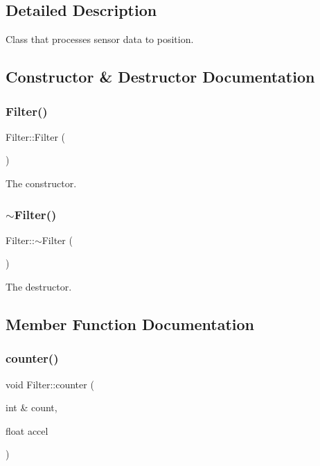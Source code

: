 \subsection{Detailed Description}
Class that processes sensor data to position. 

\subsection{Constructor \& Destructor Documentation}
\mbox{\label{classFilter_ad15994c30d497afd567a6445446a249e}} 
\subsubsection{\texorpdfstring{Filter()}{Filter()}}
{\footnotesize\ttfamily Filter\+::\+Filter (\begin{DoxyParamCaption}{ }\end{DoxyParamCaption})}

The constructor. \mbox{\label{classFilter_a502ee334d42eac3edbaf32b599f9c35e}} 
\subsubsection{\texorpdfstring{$\sim$\+Filter()}{~Filter()}}
{\footnotesize\ttfamily Filter\+::$\sim$\+Filter (\begin{DoxyParamCaption}{ }\end{DoxyParamCaption})}

The destructor. 

\subsection{Member Function Documentation}
\mbox{\label{classFilter_af82d470c92431795b69c0bda29ceb534}} 
\subsubsection{\texorpdfstring{counter()}{counter()}}
{\footnotesize\ttfamily void Filter\+::counter (\begin{DoxyParamCaption}\item[{int \&}]{count,  }\item[{float}]{accel }\end{DoxyParamCaption})}



